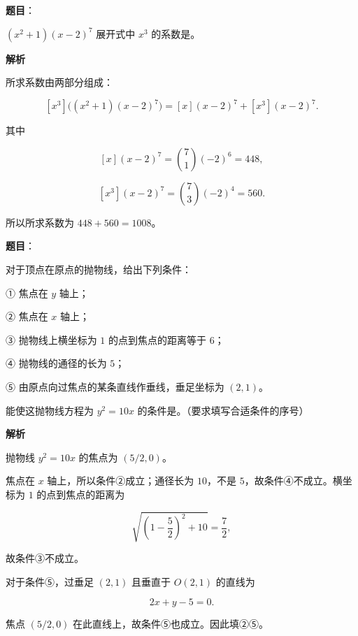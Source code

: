 \begin{answer}

\textbf{题目}：

$(x^2+1)(x-2)^7$ 展开式中 $x^3$ 的系数是\gkblank{}。

\textbf{解析}

所求系数由两部分组成：

\nopagebreak[4]
\[
[x^3]\bigl((x^2+1)(x-2)^7\bigr)
=[x](x-2)^7+[x^3](x-2)^7.
\]

其中

\nopagebreak[4]
\[
[x](x-2)^7=\binom71(-2)^6=448,
\]

\nopagebreak[4]
\[
[x^3](x-2)^7=\binom73(-2)^4=560.
\]

所以所求系数为 $448+560=1008$。


\end{answer}
\begin{answer}

\textbf{题目}：

对于顶点在原点的抛物线，给出下列条件：

① 焦点在 $y$ 轴上；

② 焦点在 $x$ 轴上；

③ 抛物线上横坐标为 $1$ 的点到焦点的距离等于 $6$；

④ 抛物线的通径的长为 $5$；

⑤ 由原点向过焦点的某条直线作垂线，垂足坐标为 $(2,1)$。

能使这抛物线方程为 $y^2=10x$ 的条件是\gkblank{}。（要求填写合适条件的序号）

\textbf{解析}

抛物线 $y^2=10x$ 的焦点为 $(5/2,0)$。

焦点在 $x$ 轴上，所以条件②成立；通径长为 $10$，不是 $5$，故条件④不成立。横坐标为 $1$ 的点到焦点的距离为

\nopagebreak[4]
\[
\sqrt{\left(1-\frac52\right)^2+10}=\frac72,
\]

故条件③不成立。

对于条件⑤，过垂足 $(2,1)$ 且垂直于 $O(2,1)$ 的直线为

\nopagebreak[4]
\[
2x+y-5=0.
\]

焦点 $(5/2,0)$ 在此直线上，故条件⑤也成立。因此填②⑤。


\end{answer}

